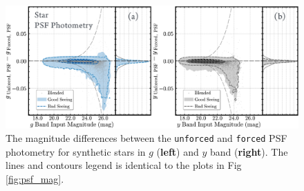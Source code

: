 \documentclass[useamsfonts]{pasj01}
\def\forced{\texttt{forced}}
\def\unforced{\texttt{unforced}}
\begin{document}
\begin{figure}
    \begin{center}
        \includegraphics[width=\textwidth]{fig/synpipe_psf_diff}
    \end{center}
    \caption{
        The magnitude differences between the \unforced{} and \forced{}
        PSF photometry for synthetic stars in $g$ (\textbf{left}) and $y$ band
        (\textbf{right}).
        The lines and contours legend is identical to the plots in Fig \ref{fig:psf_mag}.
        }
    \label{fig:psf_diff}
\end{figure}
\end{document}
